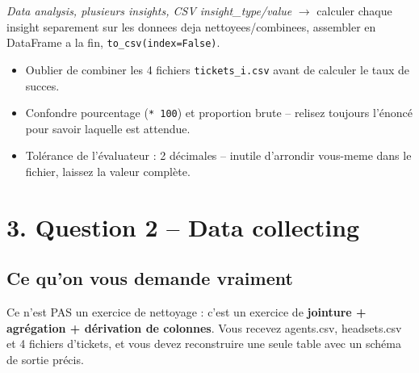 \documentclass[11pt]{article}
\newcommand{\exhead}[1]{\subsection{#1}}
\begin{document}
\begin{pat}
\emph{\og Data analysis, plusieurs insights, CSV insight\_type/value \fg}
$\to$ calculer chaque insight separement sur les donnees deja
nettoyees/combinees, assembler en DataFrame a la fin,
\texttt{to\_csv(index=False)}.
\end{pat}

\begin{trap}
\begin{itemize}[nosep]
  \item Oublier de combiner les 4 fichiers \texttt{tickets\_i.csv} avant
        de calculer le taux de succes.
  \item Confondre pourcentage (\texttt{* 100}) et proportion brute --
        relisez toujours l'\'enonc\'e pour savoir laquelle est attendue.
  \item Tol\'erance de l'\'evaluateur : 2 d\'ecimales -- inutile
        d'arrondir vous-meme dans le fichier, laissez la valeur compl\`ete.
\end{itemize}
\end{trap}

\section{3. Question 2 -- Data collecting}

\exhead{Ce qu'on vous demande vraiment}
Ce n'est PAS un exercice de nettoyage : c'est un exercice de
\textbf{jointure + agr\'egation + d\'erivation de colonnes}. Vous recevez
agents.csv, headsets.csv et 4 fichiers
d'tickets, et vous devez reconstruire une seule table
avec un sch\'ema de sortie pr\'ecis.
\end{document}
